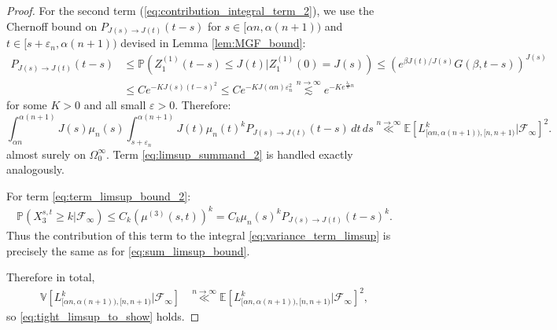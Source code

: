 \documentclass[10pt,a4paper]{amsart}
\newcommand{\llas}[2]{\overset{{#1}\to {#2}}{\ll}}
\newcommand{\lsimas}[2]{\overset{{#1}\to {#2}}{\lesssim}}
\begin{document}
\begin{proof}
  For the second term (\ref{eq:contribution_integral_term_2}), we use the Chernoff bound on $P_{J(s)\to J(t)}(t-s)$ for $s\in [\alpha n,\alpha(n+1))$ and $t\in [s+\varepsilon_n, \alpha(n+1))$ devised in Lemma \ref{lem:MGF_bound}:
  \begin{align*}
    P_{J(s)\to J(t)}(t-s)&\leq \mathbb{P}(Z_1^{(1)}(t-s)\leq J(t)|Z_1^{(1)}(0)=J(s))\leq\left(e^{\beta J(t)/J(s)}G(\beta,t-s)\right)^{J(s)}\\
    &\leq C e^{-KJ(s)(t-s)^2}\leq Ce^{-KJ(\alpha n)\varepsilon_n^2}\lsimas{n}{\infty} e^{-Ke^{\frac{\lambda_0}{8}n}}
  \end{align*}
  for some $K>0$ and all small $\varepsilon>0$. Therefore:
  \[
  \int_{\alpha n}^{\alpha(n+1)}J(s)\mu_n(s)\int_{s+\varepsilon_n}^{\alpha(n+1)}J(t)\mu_n(t)^kP_{J(s)\to J(t)}(t-s)\,dt\,ds\llas{n}{\infty} \mathbb{E}\left[L_{[\alpha n,\alpha (n+1)),[n,n+1)}^{k}|\mathcal{F}_\infty\right]^2.
  \]
almost surely on $\Omega_0^\infty$. Term \ref{eq:limsup_summand_2} is handled exactly analogously.

  For term \ref{eq:term_limsup_bound_2}:
  \begin{align*}
    \mathbb{P}(X_{3}^{s,t}\geq k|\mathcal{F}_\infty)\leq C_k(\mu^{(3)}(s,t))^k=C_k\mu_n(s)^kP_{J(s)\to J(t)}(t-s)^k.
  \end{align*}
  Thus the contribution of this term to the integral \ref{eq:variance_term_limsup} is precisely the same as for \ref{eq:sum_limsup_bound}.

  Therefore in total,
  \begin{align*}
    \mathbb{V}\left[L_{[\alpha n,\alpha (n+1)),[n,n+1)}^k|\mathcal{F}_\infty\right]&\llas{n}{\infty}\mathbb{E}[L_{[\alpha n,\alpha (n+1)),[n,n+1)}^k|\mathcal{F}_\infty]^2,
  \end{align*}
  so \ref{eq:tight_limsup_to_show} holds.
\end{proof}
\end{document}
